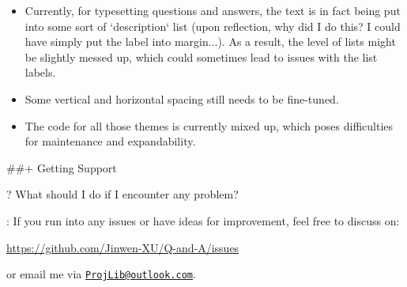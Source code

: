 \documentclass[%
  use style = classical,
  scroll,
]{Q-and-A}
\begin{document}
\begin{itemize}
    \item Currently, for typesetting questions and answers, the text is in fact being put into some sort of `description` list (upon reflection, why did I do this? I could have simply put the label into margin...). As a result, the level of lists might be slightly messed up, which could sometimes lead to issues with the list labels.
    \item Some vertical and horizontal spacing still needs to be fine-tuned.
    \item The code for all those themes is currently mixed up, which poses difficulties for maintenance and expandability.
  \end{itemize}


##+ {Getting Support}

?
  What should I do if I encounter any problem?

:
  If you run into any issues or have ideas for improvement, feel free to discuss on:
  \begin{center}
      \url{https://github.com/Jinwen-XU/Q-and-A/issues}
  \end{center}
  or email me via \href{mailto:ProjLib@outlook.com}{\texttt{ProjLib@outlook.com}}.


\vspace{3\baselineskip}



\end{document}
